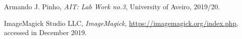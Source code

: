 \documentclass[12pt]{article}
\begin{document}
\begin{thebibliography}{9} %
  

    Armando J. Pinho,
    \textit{AIT: Lab Work no.3},
    University of Aveiro,
    2019/20.
  
    ImageMagick Studio LLC,
    \textit{ImageMagick},
    \url{https://imagemagick.org/index.php},
    accessed in December 2019.
  
\end{thebibliography}

\clearpage
\end{document}
